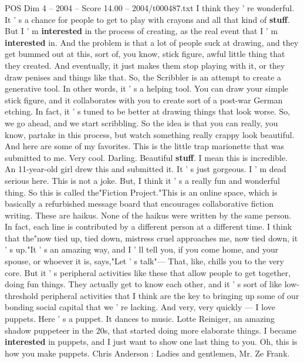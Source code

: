 \begin{textsample}{POS Dim 4 – 2004 – Score 14.00 – 2004/t000487.txt}
I think they ' re wonderful.
It ' s a chance for people to get to play with crayons and all that kind of \textbf{stuff}.
But I ' m \textbf{interested} in the process of creating, as the real event that I ' m \textbf{interested} in.
And the problem is that a lot of people suck at drawing, and they get bummed out at this, sort of, you know, stick figure, awful little thing that they created.
And eventually, it just makes them stop playing with it, or they draw penises and things like that.
So, the Scribbler is an attempt to create a generative tool.
In other words, it ' s a helping tool.
You can draw your simple stick figure, and it collaborates with you to create sort of a post-war German etching.
In fact, it ' s tuned to be better at drawing things that look worse.
So, we go ahead, and we start scribbling.
So the idea is that you can really, you know, partake in this process, but watch something really crappy look beautiful.
And here are some of my favorites.
This is the little trap marionette that was submitted to me.
Very cool.
Darling.
Beautiful \textbf{stuff}.
I mean this is incredible.
An 11-year-old girl drew this and submitted it.
It ' s just gorgeous.
I ' m dead serious here.
This is not a joke.
But, I think it ' s a really fun and wonderful thing.
So this is called the"Fiction Project."This is an online space, which is basically a refurbished message board that encourages collaborative fiction writing.
These are haikus.
None of the haikus were written by the same person.
In fact, each line is contributed by a different person at a different time.
I think that the"now tied up, tied down, mistress cruel approaches me, now tied down, it ' s up."It ' s an amazing way, and I ' ll tell you, if you come home, and your spouse, or whoever it is, says,"Let ' s talk"— That, like, chills you to the very core.
But it ' s peripheral activities like these that allow people to get together, doing fun things.
They actually get to know each other, and it ' s sort of like low-threshold peripheral activities that I think are the key to bringing up some of our bonding social capital that we ' re lacking.
And very, very quickly — I love puppets.
Here ' s a puppet.
It dances to music.
Lotte Reiniger, an amazing shadow puppeteer in the 20s, that started doing more elaborate things.
I became \textbf{interested} in puppets, and I just want to show one last thing to you.
Oh, this is how you make puppets.
Chris Anderson : Ladies and gentlemen, Mr.
Ze Frank.

\end{textsample}
